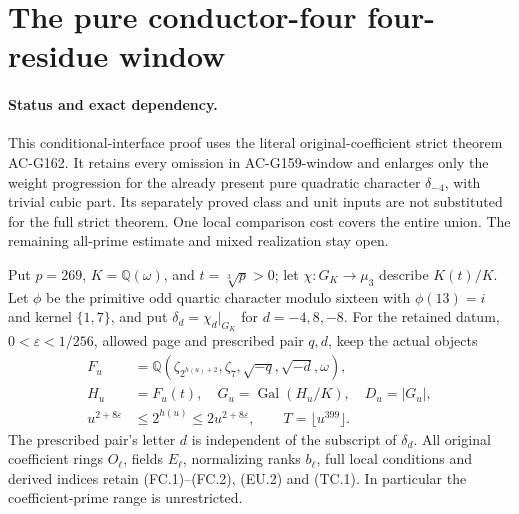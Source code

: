 \section{The pure conductor-four four-residue window}
\label{sec:pure-conductor4-quarter-actual-window}

\paragraph{Status and exact dependency.}
This conditional-interface proof uses the literal original-coefficient
strict theorem AC-G162.  It retains every omission in AC-G159-window
and enlarges only the weight progression for the already present
pure quadratic character $\delta_{-4}$, with trivial cubic part.
Its separately proved class and unit inputs are not substituted for
the full strict theorem.  One local comparison cost covers the entire union.
The remaining all-prime estimate and mixed realization stay open.

Put $p=269$, $K=\mathbb Q(\omega)$, and $t=\sqrt[3]p>0$;
let $\chi:G_K\to\mu_3$ describe $K(t)/K$.
Let $\phi$ be the primitive odd quartic character modulo sixteen
with $\phi(13)=i$ and kernel $\{1,7\}$, and put
$\delta_d=\chi_d|_{G_K}$ for $d=-4,8,-8$.
For the retained datum, $0<\varepsilon<1/256$, allowed page and
prescribed pair $q,d$, keep the actual objects
\[
 \begin{aligned}
 F_u&=\mathbb Q(\zeta_{2^{h(u)+2}},\zeta_7,
                           \sqrt{-q},\sqrt{-d},\omega),\\
 H_u&=F_u(t),\quad G_u=\operatorname{Gal}(H_u/K),\quad D_u=|G_u|,\\
 u^{2+8\varepsilon}&\leq2^{h(u)}\leq2u^{2+8\varepsilon},
                         \qquad T=\lfloor u^{399}\rfloor .
 \end{aligned}
 \tag{P4QW.1}
\]
The prescribed pair's letter $d$ is independent of the subscript
of $\delta_d$.
All original coefficient rings $O_\ell$, fields $E_\ell$,
normalizing ranks $b_\ell$, full local conditions and derived
indices retain (FC.1)--(FC.2), (EU.2) and (TC.1).
In particular the coefficient-prime range is unrestricted.

